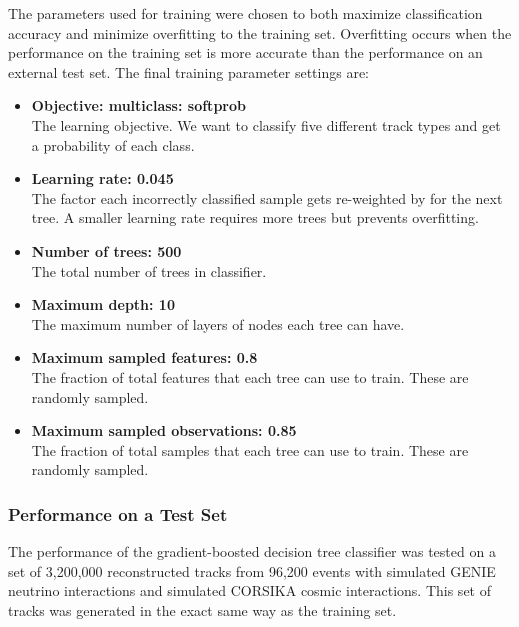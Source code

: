     The parameters used for training were chosen to both maximize
    classification accuracy and minimize overfitting to the training set.
    Overfitting occurs when the performance on the training set is more
    accurate than the performance on an external test set. The final training
    parameter settings are:
    \begin{itemize}
      \item \textbf{Objective: multiclass: softprob} \\
      The learning objective. We want to classify five different track types
      and get a probability of each class.  
      \item \textbf{Learning rate: 0.045}  \\
      The factor each incorrectly classified sample gets re-weighted by for the
      next tree.  A smaller learning rate requires more trees but prevents
      overfitting.
      \item \textbf{Number of trees: 500} \\
      The total number of trees in classifier.
      \item \textbf{Maximum depth: 10} \\ 
      The maximum number of layers of nodes each tree can have.
      \item \textbf{Maximum sampled features: 0.8} \\
      The fraction of total features that each tree can use to train. These are
      randomly sampled.
      \item \textbf{Maximum sampled observations: 0.85} \\
      The fraction of total samples that each tree can use to train. These are
      randomly sampled.
    \end{itemize}

  \subsubsection{Performance on a Test Set}\label{sec:protonidtest}
    The performance of the gradient-boosted decision tree classifier was tested
    on a set of 3,200,000 reconstructed tracks from 96,200 events with
    simulated GENIE neutrino interactions and simulated CORSIKA cosmic
    interactions. This set of tracks was generated in the exact same way as the
    training set.

